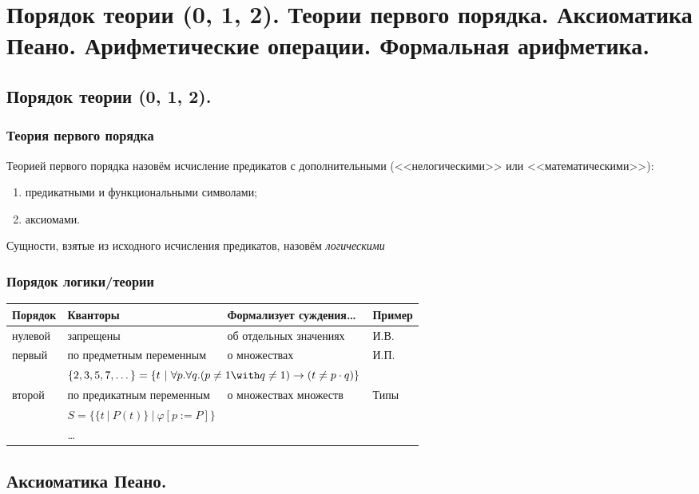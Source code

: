 \documentclass[10pt,a4paper,oneside]{article}
\begin{document}
\section{Порядок теории (0, 1, 2). Теории первого порядка. Аксиоматика Пеано. Арифметические операции. Формальная арифметика.}
\subsection{Порядок теории (0, 1, 2).}

\subsubsection{Теория первого порядка}
Теорией первого порядка назовём исчисление предикатов с дополнительными (<<нелогическими>>
или <<математическими>>):
\begin{enumerate}
\item предикатными и функциональными символами;
\item аксиомами.
\end{enumerate}

Сущности, взятые из исходного исчисления предикатов, назовём \emph{логическими}

\subsubsection{Порядок логики/теории}
\begin{tabular}{llll}
Порядок & Кванторы & Формализует суждения\dots & Пример\\\hline
нулевой & запрещены & об отдельных значениях & И.В.\\
первый & по предметным переменным & о множествах & И.П.\\
    &   \multicolumn{2}{l}{\color{olive}$\{2,3,5,7,\dots\} = \{ t\ |\ \forall p.\forall q.(p \ne 1 \with q \ne 1) \rightarrow (t \ne p\cdot q)\}$}\\
второй & по предикатным переменным & о множествах множеств & Типы\\
    &   \multicolumn{2}{l}{\color{olive}$S = \{ \{t\ |\ P(t)\}\ |\ \varphi[p := P] \}$}\\
 & \dots 
\end{tabular}

\subsection{Аксиоматика Пеано.}
\end{document}
